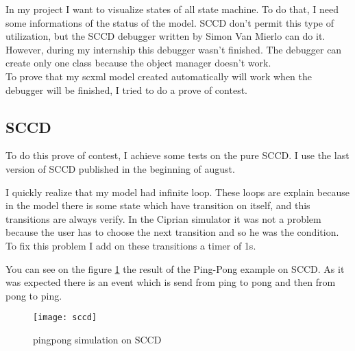 In my project I want to visualize states of all state machine. To do that, I need some informations of the status of the model. SCCD don't permit this type of utilization, but the SCCD debugger written by Simon Van Mierlo can do it.
~\\

However, during my internship this debugger wasn't finished. The debugger can create only one class because the object manager doesn't work.
~\\

To prove that my scxml model created automatically will work when the debugger will be finished, I tried to do a prove of contest. %

\subsection{SCCD}

To do this prove of contest, I achieve some tests on the pure SCCD. I use the last version of SCCD published in the beginning of august.


I quickly realize that my model had infinite loop. These loops are explain because in the model there is some state which have transition on itself, and this transitions are always verify. In the Ciprian simulator it was not a problem because the user has to choose the next transition and so he was the condition. To fix this problem I add on these transitions a timer of 1s.

You can see on the figure \ref{fig:sccd} the result of the Ping-Pong example on SCCD. As it was expected there is an event which is send from ping to pong and then from pong to ping.

\begin{figure}[h]
  \centering
  \texttt{[image: sccd]}
  \caption{pingpong simulation on SCCD}
  \label{fig:sccd}
\end{figure}


